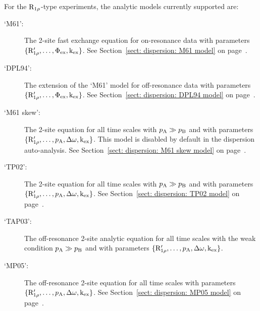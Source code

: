 For the $\mathrm{R}_{1\rho}$-type experiments, the analytic models currently supported are:
\begin{description}
  \item[`M61':]  The \citet{Meiboom61} 2-site fast exchange equation for on-resonance data with parameters $\{\mathrm{R}_{1\rho}', \dots, \Phi_{\textrm{ex}}, \textrm{k}_{\textrm{ex}}\}$.
    See Section~\ref{sect: dispersion: M61 model} on page~\pageref{sect: dispersion: M61 model}.
  \item[`DPL94':]  The \citet{Davis94} extension of the `M61' model for off-resonance data with parameters $\{\mathrm{R}_{1\rho}', \dots, \Phi_{\textrm{ex}}, \textrm{k}_{\textrm{ex}}\}$.
    See Section~\ref{sect: dispersion: DPL94 model} on page~\pageref{sect: dispersion: DPL94 model}.
  \item[`M61 skew':]  The \citet{Meiboom61} 2-site equation for all time scales with $p_{\textrm{A}} \gg p_{\textrm{B}}$ and with parameters $\{\mathrm{R}_{1\rho}', \dots, p_{\textrm{A}}, \Delta\omega, \textrm{k}_{\textrm{ex}}\}$.
    This model is disabled by default in the dispersion auto-analysis.
    See Section~\ref{sect: dispersion: M61 skew model} on page~\pageref{sect: dispersion: M61 skew model}.
  \item[`TP02':]  The \citet{TrottPalmer02} 2-site equation for all time scales with $p_{\textrm{A}} \gg p_{\textrm{B}}$ and with parameters $\{\mathrm{R}_{1\rho}', \dots, p_{\textrm{A}}, \Delta\omega, \textrm{k}_{\textrm{ex}}\}$.
    See Section~\ref{sect: dispersion: TP02 model} on page~\pageref{sect: dispersion: TP02 model}.
  \item[`TAP03':]  The \citet{Trott03} off-resonance 2-site analytic equation for all time scales with the weak condition $p_{\textrm{A}} \gg p_{\textrm{B}}$ and with parameters $\{\mathrm{R}_{1\rho}', \dots, p_{\textrm{A}}, \Delta\omega, \textrm{k}_{\textrm{ex}}\}$.
  \item[`MP05':]  The \citet{MiloushevPalmer05} off-resonance 2-site equation for all time scales with parameters $\{\mathrm{R}_{1\rho}', \dots, p_{\textrm{A}}, \Delta\omega, \textrm{k}_{\textrm{ex}}\}$.
    See Section~\ref{sect: dispersion: MP05 model} on page~\pageref{sect: dispersion: MP05 model}.
\end{description}


